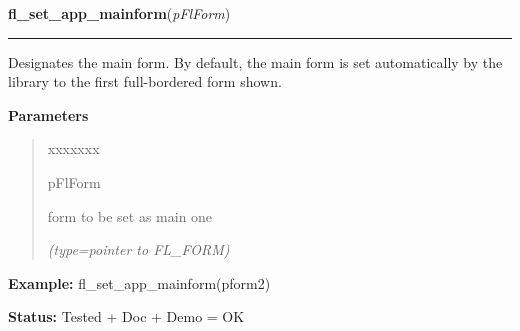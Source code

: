\hspace{.8\funcindent}\begin{boxedminipage}{\funcwidth}

    \raggedright \textbf{fl\_set\_app\_mainform}(\textit{pFlForm})

    \vspace{-1.5ex}

    \rule{\textwidth}{0.5\fboxrule}
\setlength{\parskip}{2ex}
    Designates the main form. By default, the main form is set 
    automatically by the library to the first full-bordered form shown.

\setlength{\parskip}{1ex}
      \textbf{Parameters}
      \vspace{-1ex}

      \begin{quote}
        \begin{Ventry}{xxxxxxx}

          \item[pFlForm]

          form to be set as main one

            {\it (type=pointer to FL\_FORM)}

        \end{Ventry}

      \end{quote}

\textbf{Example:} fl\_set\_app\_mainform(pform2)



\textbf{Status:} Tested + Doc + Demo = OK



    \end{boxedminipage}

    \label{xformslib:flbasic:fl_get_app_mainform}

    \vspace{0.5ex}


